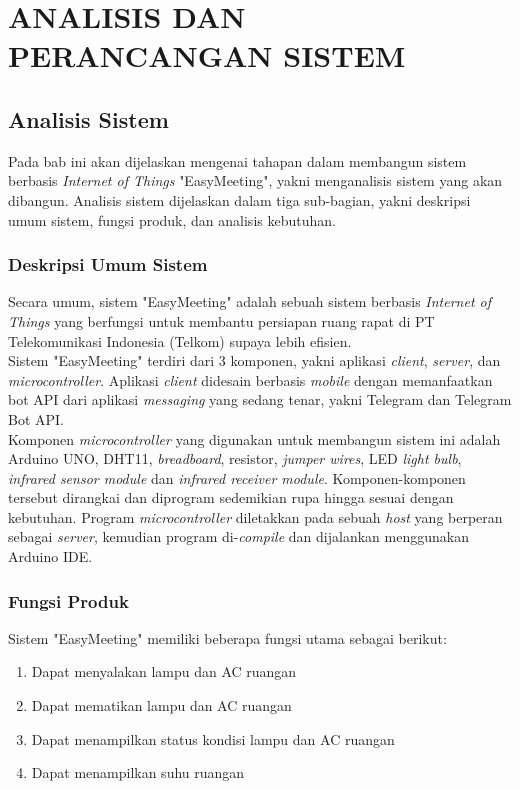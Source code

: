 \chapter{ANALISIS DAN PERANCANGAN SISTEM}
\section{Analisis Sistem}
\tab Pada bab ini akan dijelaskan mengenai tahapan dalam membangun sistem berbasis \textit{Internet of Things} "EasyMeeting", yakni menganalisis sistem yang akan dibangun. Analisis sistem dijelaskan dalam tiga sub-bagian, yakni deskripsi umum sistem, fungsi produk, dan analisis kebutuhan.

\subsection{Deskripsi Umum Sistem}
\tab Secara umum, sistem "EasyMeeting" adalah sebuah sistem berbasis \textit{Internet of Things} yang berfungsi untuk membantu persiapan ruang rapat di PT Telekomunikasi Indonesia (Telkom) supaya lebih efisien.\\
\tab Sistem "EasyMeeting" terdiri dari 3 komponen, yakni aplikasi \textit{client}, \textit{server}, dan \textit{microcontroller}. Aplikasi \textit{client} didesain berbasis \textit{mobile} dengan memanfaatkan bot API dari aplikasi \textit{messaging} yang sedang tenar, yakni Telegram dan Telegram Bot API. \\
\tab Komponen \textit{microcontroller} yang digunakan untuk membangun sistem ini adalah Arduino UNO, DHT11, \textit{breadboard}, resistor, \textit{jumper wires}, LED \textit{light bulb}, \textit{infrared sensor module} dan \textit{infrared receiver module}. Komponen-komponen tersebut dirangkai dan diprogram sedemikian rupa hingga sesuai dengan kebutuhan. Program \textit{microcontroller} diletakkan pada sebuah \textit{host} yang berperan sebagai \textit{server}, kemudian program di-\textit{compile} dan dijalankan menggunakan Arduino IDE.

\subsection{Fungsi Produk}
\tab Sistem "EasyMeeting" memiliki beberapa fungsi utama sebagai berikut:
\begin{enumerate}
	\item Dapat menyalakan lampu dan AC ruangan
	\item Dapat mematikan lampu dan AC ruangan
	\item Dapat menampilkan status kondisi lampu dan AC ruangan
	\item Dapat menampilkan suhu ruangan
\end{enumerate}

